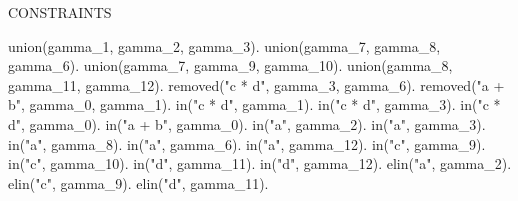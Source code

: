 \documentclass[a4paper, 11pt]{article}
\begin{document}
CONSTRAINTS 

union(gamma\_1, gamma\_2, gamma\_3).
union(gamma\_7, gamma\_8, gamma\_6).
union(gamma\_7, gamma\_9, gamma\_10).
union(gamma\_8, gamma\_11, gamma\_12).
removed("c * d", gamma\_3, gamma\_6).
removed("a + b", gamma\_0, gamma\_1).
in("c * d", gamma\_1).
in("c * d", gamma\_3).
in("c * d", gamma\_0).
in("a + b", gamma\_0).
in("a", gamma\_2).
in("a", gamma\_3).
in("a", gamma\_8).
in("a", gamma\_6).
in("a", gamma\_12).
in("c", gamma\_9).
in("c", gamma\_10).
in("d", gamma\_11).
in("d", gamma\_12).
elin("a", gamma\_2).
elin("c", gamma\_9).
elin("d", gamma\_11).
\end{document}
